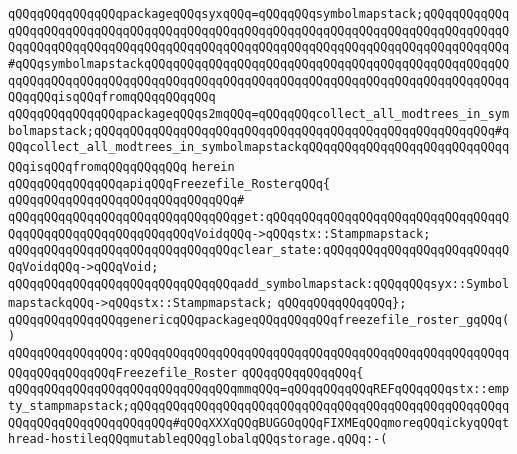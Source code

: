 \verb|qQQqqQQqqQQqqQQqpackageqQQqsyxqQQq=qQQqqQQqsymbolmapstack;qQQqqQQqqQQqqQQqqQQqqQQqqQQqqQQqqQQqqQQqqQQqqQQqqQQqqQQqqQQqqQQqqQQqqQQqqQQqqQQqqQQqqQQqqQQqqQQqqQQqqQQqqQQqqQQqqQQqqQQqqQQqqQQqqQQqqQQqqQQqqQQqqQQqqQQq#qQQqsymbolmapstackqQQqqQQqqQQqqQQqqQQqqQQqqQQqqQQqqQQqqQQqqQQqqQQqqQQqqQQqqQQqqQQqqQQqqQQqqQQqqQQqqQQqqQQqqQQqqQQqqQQqqQQqqQQqqQQqqQQqqQQqqQQqqQQqisqQQqfromqQQqqQQqqQQq|\newline
\verb|qQQqqQQqqQQqqQQqpackageqQQqs2mqQQq=qQQqqQQqcollect_all_modtrees_in_symbolmapstack;qQQqqQQqqQQqqQQqqQQqqQQqqQQqqQQqqQQqqQQqqQQqqQQqqQQqqQQq#qQQqcollect_all_modtrees_in_symbolmapstackqQQqqQQqqQQqqQQqqQQqqQQqqQQqqQQqisqQQqfromqQQqqQQqqQQq|\newline
\verb|herein|\newline
\newline
\verb|qQQqqQQqqQQqqQQqapiqQQqFreezefile_RosterqQQq{|\newline
\verb|qQQqqQQqqQQqqQQqqQQqqQQqqQQqqQQq#|\newline
\verb|qQQqqQQqqQQqqQQqqQQqqQQqqQQqqQQqget:qQQqqQQqqQQqqQQqqQQqqQQqqQQqqQQqqQQqqQQqqQQqqQQqqQQqqQQqqQQqVoidqQQq->qQQqstx::Stampmapstack;|\newline
\verb|qQQqqQQqqQQqqQQqqQQqqQQqqQQqqQQqclear_state:qQQqqQQqqQQqqQQqqQQqqQQqqQQqVoidqQQq->qQQqVoid;|\newline
\verb|qQQqqQQqqQQqqQQqqQQqqQQqqQQqqQQqadd_symbolmapstack:qQQqqQQqsyx::SymbolmapstackqQQq->qQQqstx::Stampmapstack;|\newline
\verb|qQQqqQQqqQQqqQQq};|\newline
\newline
\newline
\verb|qQQqqQQqqQQqqQQqgenericqQQqpackageqQQqqQQqqQQqfreezefile_roster_gqQQq()|\newline
\verb|qQQqqQQqqQQqqQQq:qQQqqQQqqQQqqQQqqQQqqQQqqQQqqQQqqQQqqQQqqQQqqQQqqQQqqQQqqQQqqQQqqQQqFreezefile_Roster|\newline
\verb|qQQqqQQqqQQqqQQq{|\newline
\verb|qQQqqQQqqQQqqQQqqQQqqQQqqQQqqQQqmmqQQq=qQQqqQQqqQQqREFqQQqqQQqstx::empty_stampmapstack;qQQqqQQqqQQqqQQqqQQqqQQqqQQqqQQqqQQqqQQqqQQqqQQqqQQqqQQqqQQqqQQqqQQqqQQqqQQq#qQQqXXXqQQqBUGGOqQQqFIXMEqQQqmoreqQQqickyqQQqthread-hostileqQQqmutableqQQqglobalqQQqstorage.qQQq:-(|\newline
